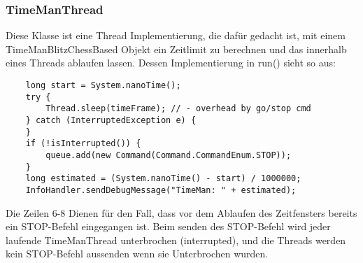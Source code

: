 \subsubsection{TimeManThread}
Diese Klasse ist eine Thread Implementierung, die dafür gedacht ist, mit einem TimeManBlitzChessBased Objekt ein Zeitlimit zu berechnen und das innerhalb eines Threads ablaufen lassen. Dessen Implementierung in run() sieht so aus: 
\lstset{
  numbers=left,
  stepnumber=1,    
  firstnumber=1,
  numberfirstline=true
}
\begin{lstlisting}
    long start = System.nanoTime();
    try {
        Thread.sleep(timeFrame); // - overhead by go/stop cmd
    } catch (InterruptedException e) {
    }
    if (!isInterrupted()) {
        queue.add(new Command(Command.CommandEnum.STOP));
    }
    long estimated = (System.nanoTime() - start) / 1000000;
    InfoHandler.sendDebugMessage("TimeMan: " + estimated);
\end{lstlisting}
Die Zeilen 6-8 Dienen f\"ur den Fall, dass vor dem Ablaufen des Zeitfensters bereits ein STOP-Befehl eingegangen ist. Beim senden des STOP-Befehl wird jeder laufende TimeManThread unterbrochen (interrupted), und die Threads werden kein STOP-Befehl aussenden wenn sie Unterbrochen wurden.

